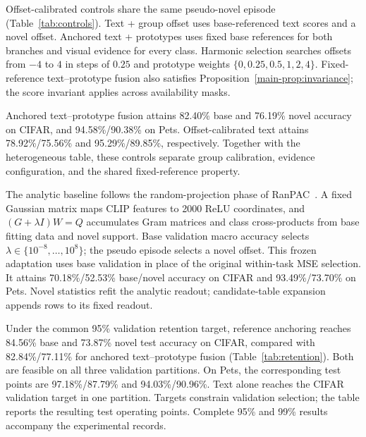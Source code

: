 \documentclass[preprint,review,12pt]{elsarticle}
\begin{document}
Offset-calibrated controls share the same pseudo-novel episode (Table~\ref{tab:controls}). Text + group offset uses base-referenced text scores and a novel offset. Anchored text + prototypes uses fixed base references for both branches and visual evidence for every class. Harmonic selection searches offsets from $-4$ to $4$ in steps of $0.25$ and prototype weights $\{0,0.25,0.5,1,2,4\}$. Fixed-reference text--prototype fusion also satisfies Proposition~\ref{main-prop:invariance}; the score invariant applies across availability masks.

Anchored text--prototype fusion attains 82.40\% base and 76.19\% novel accuracy on CIFAR, and 94.58\%/90.38\% on Pets. Offset-calibrated text attains 78.92\%/75.56\% and 95.29\%/89.85\%, respectively. Together with the heterogeneous table, these controls separate group calibration, evidence configuration, and the shared fixed-reference property.

The analytic baseline follows the random-projection phase of RanPAC~\cite{mcdonnell2023ranpac}. A fixed Gaussian matrix maps CLIP features to 2000 ReLU coordinates, and $(G+\lambda I)W=Q$ accumulates Gram matrices and class cross-products from base fitting data and novel support. Base validation macro accuracy selects $\lambda\in\{10^{-8},\ldots,10^8\}$; the pseudo episode selects a novel offset. This frozen adaptation uses base validation in place of the original within-task MSE selection. It attains 70.18\%/52.53\% base/novel accuracy on CIFAR and 93.49\%/73.70\% on Pets. Novel statistics refit the analytic readout; candidate-table expansion appends rows to its fixed readout.

\begin{table}[t]
\centering
\caption{Validation retention-targeted calibration at five shots. The pseudo-base target is 95\% of the closed reference-table pseudo-base accuracy. Among feasible grid points, selection maximizes pseudo-novel accuracy; infeasible partitions use the point with highest pseudo-base accuracy, then pseudo-novel accuracy. Feasible counts refer to validation partitions. Test values are percentages, mean $\pm$ sample standard deviation; test retention is not constrained.}
\label{tab:retention}
\resizebox{\linewidth}{!}{}
\end{table}

Under the common 95\% validation retention target, reference anchoring reaches 84.56\% base and 73.87\% novel test accuracy on CIFAR, compared with 82.84\%/77.11\% for anchored text--prototype fusion (Table~\ref{tab:retention}). Both are feasible on all three validation partitions. On Pets, the corresponding test points are 97.18\%/87.79\% and 94.03\%/90.96\%. Text alone reaches the CIFAR validation target in one partition. Targets constrain validation selection; the table reports the resulting test operating points. Complete 95\% and 99\% results accompany the experimental records.
\end{document}
